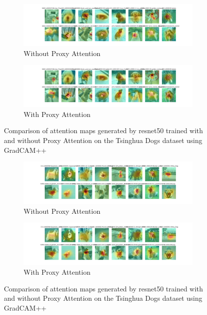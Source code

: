 \documentclass[a4paper,11pt,openright]{book}
\begin{document}
\begin{figure}[!htb]
    \centering
    \begin{subfigure}[b]{1\textwidth}
        \includegraphics[width=\textwidth]{images/gpp_tsing_resnet50_noproxy_1.pdf}
        \caption{Without Proxy Attention}
    \end{subfigure}
    \hfill
    \begin{subfigure}[b]{1\textwidth}
        \includegraphics[width=\textwidth]{images/gpp_tsing_resnet50_proxy_1.pdf}
        \caption{With Proxy Attention}
    \end{subfigure}
    \caption{Comparison of attention maps generated by resnet50 trained with and without Proxy Attention on the Tsinghua Dogs dataset using GradCAM++}
\end{figure}


\begin{figure}[!htb]
    \centering
    \begin{subfigure}[b]{1\textwidth}
        \includegraphics[width=\textwidth]{images/gpp_tsing_resnet50_noproxy_2.pdf}
        \caption{Without Proxy Attention}
    \end{subfigure}
    \hfill
    \begin{subfigure}[b]{1\textwidth}
        \includegraphics[width=\textwidth]{images/gpp_tsing_resnet50_proxy_2.pdf}
        \caption{With Proxy Attention}
    \end{subfigure}
    \caption{Comparison of attention maps generated by resnet50 trained with and without Proxy Attention on the Tsinghua Dogs dataset using GradCAM++}
\end{figure}
\end{document}
